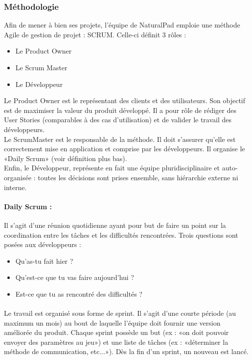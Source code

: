 	\subsubsection{Méthodologie}
Afin de mener à bien ses projets, l’équipe de NaturalPad emploie une méthode Agile de gestion de projet : SCRUM.
Celle-ci définit 3 rôles :
	\begin{itemize}
		\item Le Product Owner
		\item Le Scrum Master
		\item Le Développeur
	\end {itemize}
Le Product Owner est le représentant des clients et des utilisateurs. Son objectif est de maximiser la valeur du produit développé. Il a pour rôle de rédiger des User Stories (comparables à des cas d'utilisation) et de valider le travail des développeurs. 
\\Le ScrumMaster est le responsable de la méthode. Il doit s’assurer qu’elle est correctement mise en application et comprise par les développeurs. Il organise le «Daily Scrum» (voir définition plus bas).
\\Enfin, le Développeur, représente en fait une équipe pluridisciplinaire et auto-organisée : toutes les décisions sont prises ensemble, sans hiérarchie externe ni interne.
 
		\paragraph{Daily Scrum :}
Il s’agit d’une réunion quotidienne ayant pour but de faire un point sur la coordination entre les tâches et les difficultés rencontrées.  Trois questions sont posées aux développeurs : 
	\begin{itemize}
		\item Qu’as-tu fait hier ?
		\item Qu’est-ce que tu vas faire aujourd’hui ?
		\item Est-ce que tu as rencontré des difficultés ?
	\end {itemize}
	
\paragraph{}Le travail est organisé sous forme de sprint. Il s’agit d’une courte période (au maximum un mois) au bout de laquelle l’équipe doit fournir une version améliorée du produit. Chaque sprint possède un but (ex : «on doit pouvoir envoyer des paramètres au jeu») et une liste de tâches (ex : «déterminer la méthode de communication, etc...»). Dès la fin d’un sprint, un nouveau est lancé.

